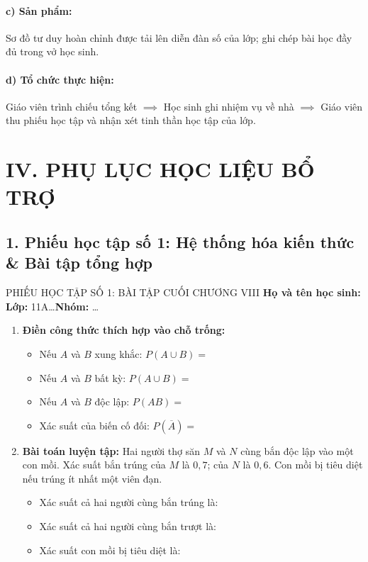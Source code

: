 \documentclass[12pt, a4paper]{article}
\begin{document}
\paragraph{c) Sản phẩm:} Sơ đồ tư duy hoàn chỉnh được tải lên diễn đàn số của lớp; ghi chép bài học đầy đủ trong vở học sinh.

\paragraph{d) Tổ chức thực hiện:} Giáo viên trình chiếu tổng kết $\implies$ Học sinh ghi nhiệm vụ về nhà $\implies$ Giáo viên thu phiếu học tập và nhận xét tinh thần học tập của lớp.

\section*{IV. PHỤ LỤC HỌC LIỆU BỔ TRỢ}

\subsection*{1. Phiếu học tập số 1: Hệ thống hóa kiến thức \& Bài tập tổng hợp}

\begin{pedabox}{PHIẾU HỌC TẬP SỐ 1: BÀI TẬP CUỐI CHƯƠNG VIII}
\textbf{Họ và tên học sinh:} \dotfill \textbf{Lớp:} 11A\dots \quad \textbf{Nhóm:} \dots
\begin{enumerate}[leftmargin=0.6cm]
    \item \textbf{Điền công thức thích hợp vào chỗ trống:}
    \begin{itemize}
        \item Nếu $A$ và $B$ xung khắc: $P(A \cup B) = $ \dotfill
        \item Nếu $A$ và $B$ bất kỳ: $P(A \cup B) = $ \dotfill
        \item Nếu $A$ và $B$ độc lập: $P(AB) = $ \dotfill
        \item Xác suất của biến cố đối: $P(\overline{A}) = $ \dotfill
    \end{itemize}

    \item \textbf{Bài toán luyện tập:}
    Hai người thợ săn $M$ và $N$ cùng bắn độc lập vào một con mồi. Xác suất bắn trúng của $M$ là $0{,}7$; của $N$ là $0{,}6$. Con mồi bị tiêu diệt nếu trúng ít nhất một viên đạn.
    \begin{itemize}
        \item Xác suất cả hai người cùng bắn trúng là: \dotfill
        \item Xác suất cả hai người cùng bắn trượt là: \dotfill
        \item Xác suất con mồi bị tiêu diệt là: \dotfill
    \end{itemize}
\end{enumerate}
\end{pedabox}
\end{document}
